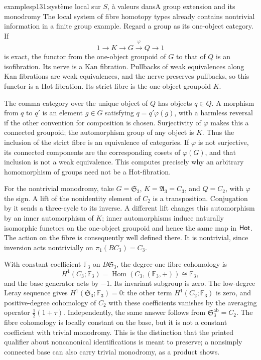 \begin{dcomment}{examples}{p131:système local sur $S$, à valeurs dans}{A group extension and its monodromy}
The local system of fibre homotopy types already contains nontrivial information in a finite group example. Regard a group as its one-object category. If
\[
 1\longrightarrow K\longrightarrow G
 \xrightarrow{\varphi}Q\longrightarrow1
\]
is exact, the functor from the one-object groupoid of \(G\) to that of \(Q\) is an isofibration. Its nerve is a Kan fibration. Pullbacks of weak equivalences along Kan fibrations are weak equivalences, and the nerve preserves pullbacks, so this functor is a Hot-fibration. Its strict fibre is the one-object groupoid \(K\).

The comma category over the unique object of \(Q\) has objects \(q\in Q\). A morphism from \(q\) to \(q'\) is an element \(g\in G\) satisfying \(q=q'\varphi(g)\), with a harmless reversal if the other convention for composition is chosen. Surjectivity of \(\varphi\) makes this a connected groupoid; the automorphism group of any object is \(K\). Thus the inclusion of the strict fibre is an equivalence of categories. If \(\varphi\) is not surjective, its connected components are the corresponding cosets of \(\varphi(G)\), and that inclusion is not a weak equivalence. This computes precisely why an arbitrary homomorphism of groups need not be a Hot-fibration.

For the nontrivial monodromy, take \(G=\mathfrak S_3\), \(K=\mathfrak A_3=C_3\), and \(Q=C_2\), with \(\varphi\) the sign. A lift of the nonidentity element of \(C_2\) is a transposition. Conjugation by it sends a three-cycle to its inverse. A different lift changes this automorphism by an inner automorphism of \(K\); inner automorphisms induce naturally isomorphic functors on the one-object groupoid and hence the same map in \(\mathsf{Hot}\). The action on the fibre is consequently well defined there. It is nontrivial, since inversion acts nontrivially on \(\pi_1(BC_3)=C_3\).

With constant coefficient \(\mathbb F_3\) on \(B\mathfrak S_3\), the degree-one fibre cohomology is
\[
 H^1(C_3;\mathbb F_3)
 =\operatorname{Hom}(C_3,(\mathbb F_3,+))
 \cong\mathbb F_3,
\]
and the base generator acts by \(-1\). Its invariant subgroup is zero. The low-degree Leray sequence gives \(H^1(\mathfrak S_3;\mathbb F_3)=0\): the other term \(H^1(C_2;\mathbb F_3)\) is zero, and positive-degree cohomology of \(C_2\) with these coefficients vanishes by the averaging operator \(\frac12(1+\tau)\). Independently, the same answer follows from \(\mathfrak S_3^{\mathrm{ab}}=C_2\). The fibre cohomology is locally constant on the base, but it is not a constant coefficient with trivial monodromy. This is the distinction that the printed qualifier about noncanonical identifications is meant to preserve; a nonsimply connected base can also carry trivial monodromy, as a product shows.
\end{dcomment}


